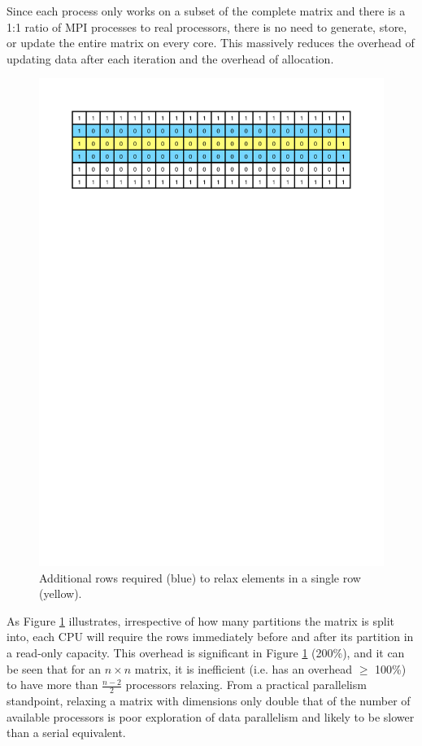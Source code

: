 \documentclass[12pt]{article}
\begin{document}
Since each process only works on a subset of the complete matrix and there is a 1:1 ratio of MPI processes to real processors, there is no need to generate, store, or update the entire matrix on every core. This massively reduces the overhead of updating data after each iteration and the overhead of allocation.

\begin{figure}[!htbp]
        \centering\includegraphics[width=.9\textwidth]{img/rowduplication.pdf}
        \caption{Additional rows required (blue) to relax elements in a single row (yellow).}
        \label{fig:duplicates}
    \end{figure}

As Figure \ref{fig:duplicates} illustrates, irrespective of how many partitions the matrix is split into, each CPU will require the rows immediately before and after its partition in a read-only capacity. This overhead is significant in Figure \ref{fig:duplicates} (200\%), and it can be seen that for an $n\times{n}$ matrix, it is inefficient (i.e. has an overhead $\geq$ 100\%) to have more than $\frac{n-2}{2}$ processors relaxing. From a practical parallelism standpoint, relaxing a matrix with dimensions only double that of the number of available processors is poor exploration of data parallelism and likely to be slower than a serial equivalent.
\end{document}
